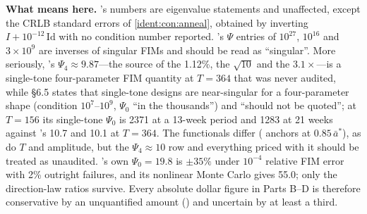 \begin{reviewernote}
\textbf{What  means here.} 's numbers are eigenvalue statements and unaffected, except the CRLB standard errors of \cref{ident:con:anneal}, obtained by inverting $I + 10^{-12}\,\mathrm{Id}$ with no condition number reported. 's $\Psi$ entries of $10^{27}$, $10^{16}$ and $3\times10^9$ are inverses of singular FIMs and should be read as ``singular''. More seriously, 's $\Psi_4 \approx 9.87$---the source of the 1.12\%, the $\sqrt{10}$ and the $3.1\times$---is a single-tone four-parameter FIM quantity at $T = 364$ that was never audited, while  \S6.5 states that single-tone designs are near-singular for a four-parameter shape (condition $10^7$--$10^9$, $\Psi_0$ ``in the thousands'') and ``should not be quoted''; at $T = 156$ its single-tone $\Psi_0$ is 2371 at a 13-week period and 1283 at 21 weeks against 's 10.7 and 10.1 at $T = 364$. The functionals differ ( anchors at $0.85\,\bar a^*$), as do $T$ and amplitude, but the $\Psi_4 \approx 10$ row and everything priced with it should be treated as unaudited. 's own $\Psi_0 = 19.8$ is $\pm35\%$ under $10^{-4}$ relative FIM error with 2\% outright failures, and its nonlinear Monte Carlo gives 55.0; only the direction-law ratios survive. Every absolute dollar figure in Parts B--D is therefore conservative by an unquantified amount () and uncertain by at least a third.
\end{reviewernote}

